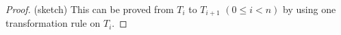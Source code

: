 \documentclass[letterpaper]{article} %
\begin{document}
\begin{proof} (sketch)
This can be proved from $T_i$ to $T_{i+1}$ $(0\leq i < n)$ by using one transformation rule on $T_i$.

%
%
%
%
%

\end{proof}
\end{document}
